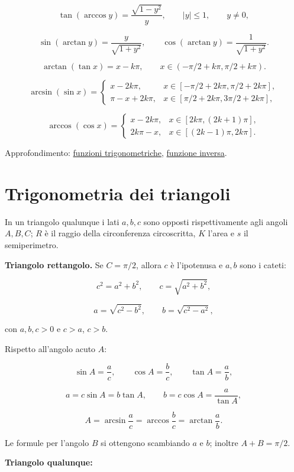 \[
\tan(\arccos y)=\frac{\sqrt{1-y^2}}{y},
\qquad |y|\le1,
\qquad y\ne0,
\]

\[
\sin(\arctan y)=\frac{y}{\sqrt{1+y^2}},
\qquad
\cos(\arctan y)=\frac1{\sqrt{1+y^2}}.
\]

\[
\arctan(\tan x)=x-k\pi,
\qquad
x\in(-\pi/2+k\pi,\pi/2+k\pi).
\]

\[
\arcsin(\sin x)=
\begin{cases}
x-2k\pi,&x\in[-\pi/2+2k\pi,\pi/2+2k\pi],\\
\pi-x+2k\pi,&x\in[\pi/2+2k\pi,3\pi/2+2k\pi],
\end{cases}
\]

\[
\arccos(\cos x)=
\begin{cases}
x-2k\pi,&x\in[2k\pi,(2k+1)\pi],\\
2k\pi-x,&x\in[(2k-1)\pi,2k\pi].
\end{cases}
\]

Approfondimento: \href{https://ingegnerismo.it/matematica/funzioni-trigonometriche/}{funzioni trigonometriche}, \href{https://ingegnerismo.it/matematica/funzione-inversa/}{funzione inversa}.

\section{Trigonometria dei triangoli}\label{trigonometria-dei-triangoli}

In un triangolo qualunque i lati \(a,b,c\) sono opposti rispettivamente agli angoli \(A,B,C\); \(R\) è il raggio della circonferenza circoscritta, \(K\) l'area e \(s\) il semiperimetro.

\textbf{Triangolo rettangolo.} Se \(C=\pi/2\), allora \(c\) è l'ipotenusa e \(a,b\) sono i cateti:

\[
c^2=a^2+b^2,
\qquad
c=\sqrt{a^2+b^2},
\]

\[
a=\sqrt{c^2-b^2},
\qquad
b=\sqrt{c^2-a^2},
\]

con \(a,b,c>0\) e \(c>a\), \(c>b\).

Rispetto all'angolo acuto \(A\):

\[
\sin A=\frac ac,
\qquad
\cos A=\frac bc,
\qquad
\tan A=\frac ab,
\]

\[
a=c\sin A=b\tan A,
\qquad
b=c\cos A=\frac a{\tan A},
\]

\[
A=\arcsin\frac ac
=\arccos\frac bc
=\arctan\frac ab.
\]

Le formule per l'angolo \(B\) si ottengono scambiando \(a\) e \(b\); inoltre \(A+B=\pi/2\).

\textbf{Triangolo qualunque:}

